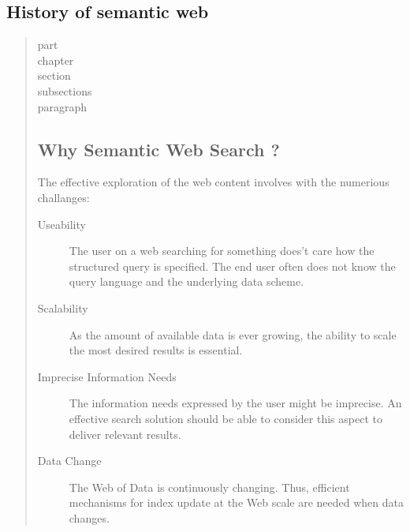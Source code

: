 \documentclass[titlepage]{report}
\begin{document}
\subsection{History of semantic web}
\begin{quote}
part\\
chapter\\
section\\
subsections\\
paragraph
\subsection{Why Semantic Web Search ?}
The effective exploration of the web content involves with the numerious challanges:
\begin{description}
\item[Useability] The user on a web searching for something does't care how the structured query is specified. The end user often does not know the query language and the underlying data scheme.
\item[Scalability] As the amount of available data is ever growing, the ability to scale the most desired results is essential.
\item[Imprecise Information Needs] The information needs expressed by the user might be imprecise. An effective search solution should be able to consider this aspect to deliver relevant results.
\item[Data Change] The Web of Data is continuously changing. Thus, efficient mechanisms for index update at the Web scale are needed when data changes. 
\end{description}
\end{quote}
\end{document}
